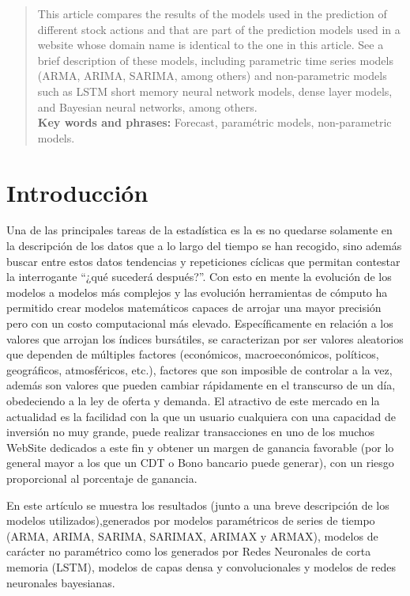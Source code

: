 \documentclass[twoside]{article}
\theoremstyle{definition}
\theoremstyle{example}
\theoremstyle{remark}
\numberwithin{equation}{section}%
\begin{document}
\begin{abstract}
 This article compares the results of the models used in the prediction of different stock actions and that are part of the prediction models used in a website whose domain name is identical to the one in this article. See a brief description of these models, including parametric time series models (ARMA, ARIMA, SARIMA, among others) and non-parametric models such as LSTM short memory neural network models, dense layer models, and Bayesian neural networks, among others.\\
 
{\bf Key words and phrases:} Forecast, paramétric models, non-parametric models.
\end{abstract}


\section{Introducci\'on}
  Una de las principales tareas de la estadística es la es no quedarse solamente en la descripción de los datos que a lo largo del tiempo se han recogido, sino además buscar entre estos datos tendencias y repeticiones cíclicas que permitan contestar la interrogante “¿qué sucederá después?”\cite{7}. Con esto en mente la evolución de los modelos a modelos más complejos y las evolución herramientas de cómputo ha permitido crear modelos matemáticos capaces de arrojar una mayor precisión pero con un costo computacional más elevado.  Específicamente en relación a los valores que arrojan los índices bursátiles, se caracterizan por ser valores aleatorios que dependen de múltiples factores (económicos, macroeconómicos, políticos, geográficos, atmosféricos, etc.), factores que son imposible de controlar a la vez, además son valores que pueden cambiar rápidamente en el transcurso de un día, obedeciendo a la ley de oferta y demanda\cite{4}. El atractivo de este mercado en la actualidad es la facilidad con la que un usuario cualquiera con una capacidad de inversión no muy grande, puede realizar transacciones en uno de los muchos WebSite dedicados a este fin y obtener un margen de ganancia favorable (por lo general mayor a los que un CDT o Bono bancario puede generar), con un riesgo proporcional al porcentaje de ganancia. 
  
En este artículo se muestra los resultados (junto a una breve descripción de los  modelos utilizados),generados por modelos paramétricos de series de tiempo (ARMA, ARIMA, SARIMA, SARIMAX, ARIMAX y ARMAX), modelos de carácter no paramétrico como los generados por Redes Neuronales de corta memoria (LSTM), modelos de capas densa y convolucionales y modelos de redes neuronales bayesianas. 
\end{document}

